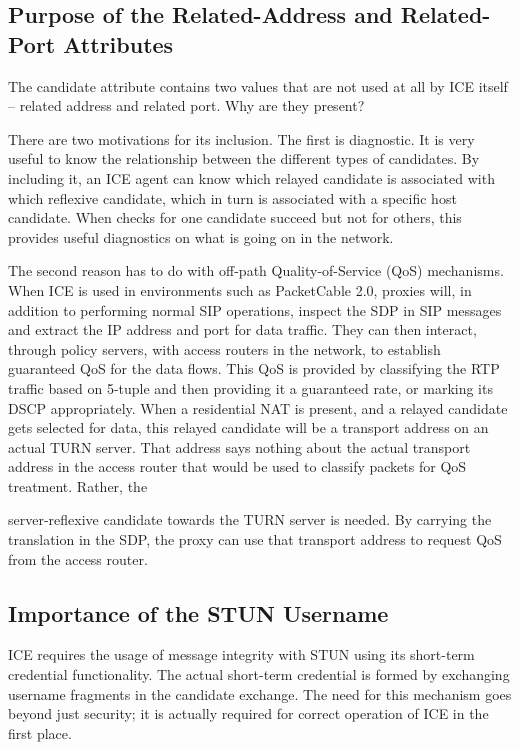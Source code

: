 \documentclass{article}
\begin{document}
\subsection{Purpose of the Related-Address and Related-Port Attributes}

The candidate attribute contains two values that are not used at all by ICE itself -- related address and related port.  Why are they present?

There are two motivations for its inclusion.  The first is diagnostic.  It is very useful to know the relationship between the different types of candidates.  By including it, an ICE agent can know which relayed candidate is associated with which reflexive candidate, which in turn is associated with a specific host candidate.  When checks for one candidate succeed but not for others, this provides useful diagnostics on what is going on in the network.

The second reason has to do with off-path Quality-of-Service (QoS) mechanisms.  When ICE is used in environments such as PacketCable 2.0, proxies will, in addition to performing normal SIP operations, inspect the SDP in SIP messages and extract the IP address and port for data traffic.  They can then interact, through policy servers, with access routers in the network, to establish guaranteed QoS for the data flows.  This QoS is provided by classifying the RTP traffic based on 5-tuple and then providing it a guaranteed rate, or marking its DSCP appropriately.  When a residential NAT is present, and a relayed candidate gets selected for data, this relayed candidate will be a transport address on an actual TURN server.  That address says nothing about the actual transport address in the access router that would be used to classify packets for QoS treatment.  Rather, the

server-reflexive candidate towards the TURN server is needed.  By carrying the translation in the SDP, the proxy can use that transport address to request QoS from the access router.

\subsection{Importance of the STUN Username}

ICE requires the usage of message integrity with STUN using its short-term credential functionality.  The actual short-term credential is formed by exchanging username fragments in the candidate exchange.  The need for this mechanism goes beyond just security; it is actually required for correct operation of ICE in the first place.
\end{document}
